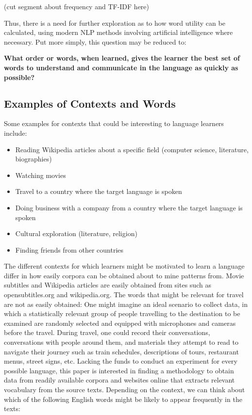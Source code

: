 (cut segment about frequency and TF-IDF here)

Thus, there is a need for further exploration as to how word utility can be calculated, using modern NLP methods involving artificial intelligence where necessary.
Put more simply, this question may be reduced to:

\textbf{What order or words, when learned, gives the learner the best set of words to understand and communicate in the language as quickly as possible?}

\subsection{Examples of Contexts and Words}
Some examples for contexts that could be interesting to language learners include:

\begin{itemize}
	\item Reading Wikipedia articles about a specific field (computer science, literature, biographies)
	\item Watching movies
	\item Travel to a country where the target language is spoken
	\item Doing business with a company from a country where the target language is spoken
	\item Cultural exploration (literature, religion)
	\item Finding friends from other countries
\end{itemize}

The different contexts for which learners might be motivated to learn a language differ in how easily corpora can be obtained about to mine patterns from. Movie subtitles and Wikipedia articles are easily obtained from sites such as opensubtitles.org and wikipedia.org. The words that might be relevant for travel are not as easily obtained: One might imagine an ideal scenario to collect data, in which a statistically relevant group of people travelling to the destination to be examined are randomly selected and equipped with microphones and cameras before the travel. During travel, one could record their conversations, conversations with people around them, and materials they attempt to read to navigate their journey such as train schedules, descriptions of tours, restaurant menus, street signs, etc. Lacking the funds to conduct an experiment for every possible language, this paper is interested in finding a methodology to obtain data from readily available corpora and websites online that extracts relevant vocabulary from the source texts.
Depending on the context, we can think about which of the following English words might be likely to appear frequently in the texts:

